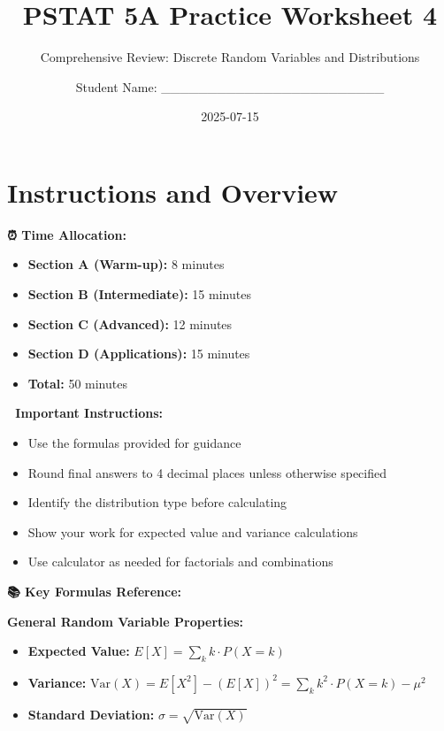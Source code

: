 \documentclass[
  11pt,
]{article}
\title{PSTAT 5A Practice Worksheet 4}
\subtitle{Comprehensive Review: Discrete Random Variables and
Distributions}
\author{Student Name: \_\_\_\_\_\_\_\_\_\_\_\_\_\_\_\_\_\_\_\_\_\_\_\_}
\date{2025-07-15}
\renewcommand*\contentsname{Table of contents}
\newcommand\contentsname{Table of contents}
\begin{document}
\maketitle

\renewcommand*\contentsname{Table of contents}
{
\hypersetup{linkcolor=}
\setcounter{tocdepth}{3}
\tableofcontents
}

\section{Instructions and Overview}\label{instructions-and-overview}

\textbf{⏰ Time Allocation:}

\begin{itemize}
\item
  \textbf{Section A (Warm-up):} 8 minutes
\item
  \textbf{Section B (Intermediate):} 15 minutes
\item
  \textbf{Section C (Advanced):} 12 minutes
\item
  \textbf{Section D (Applications):} 15 minutes
\item
  \textbf{Total:} 50 minutes
\end{itemize}

\textbf{📝 Important Instructions:}

\begin{itemize}
\item
  Use the formulas provided for guidance
\item
  Round final answers to 4 decimal places unless otherwise specified
\item
  Identify the distribution type before calculating
\item
  Show your work for expected value and variance calculations
\item
  Use calculator as needed for factorials and combinations
\end{itemize}

\textbf{📚 Key Formulas Reference:}

\textbf{General Random Variable Properties:}

\begin{itemize}
\item
  \textbf{Expected Value:} \(E[X] = \sum_{k} k \cdot P(X = k)\)
\item
  \textbf{Variance:}
  \(\text{Var}(X) = E[X^2] - (E[X])^2 = \sum_{k} k^2 \cdot P(X = k) - \mu^2\)
\item
  \textbf{Standard Deviation:} \(\sigma = \sqrt{\text{Var}(X)}\)
\end{itemize}
\end{document}
